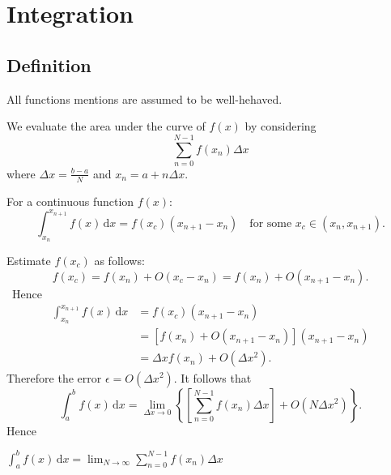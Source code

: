 \documentclass[10pt]{article}
\begin{document}
    \section{Integration}
    \subsection{Definition}
    All functions mentions are assumed to be well-hehaved.

    We evaluate the area under the curve of $f(x)$ by considering
    \[
        \sum_{n=0}^{N-1}f(x_n)\Delta x
    \]
    where $ \Delta x = \frac{b-a}{N} $ and $ x_n = a+n\Delta x. $
    \begin{theorem}[MVT]\label{thm:mean_value_theorem_for_integral}
        For a continuous function $f(x)$:
        \[
            \int_{x_n}^{x_{n+1}} f(x) \,\mathrm{d}x = f(x_c)(x_{n+1}-x_n) \quad \text{for some } x_c\in (x_n,x_{n+1})
        .\]
    \end{theorem}
    Estimate $ f(x_c) $ as follows:
    \[
        f(x_c) = f(x_n)+O(x_c-x_n) = f(x_n)+O(x_{n+1}-x_n)
    .\]\
    Hence
    \[
        \begin{aligned}
            \int_{x_n}^{x_{n+1}} f(x) \,\mathrm{d}x &= f(x_c)(x_{n+1}-x_n)\\
            &= [f(x_n)+O(x_{n+1}-x_n)](x_{n+1}-x_n)\\
            &= \Delta x f(x_n)+O(\Delta x^2).
        \end{aligned}
    \]
    Therefore the error $ \epsilon = O(\Delta x^2) $. It follows that
    \[
        \int_{a}^{b} f(x) \,\mathrm{d}x = \lim_{\Delta x \to 0} \left\{ \left[ \sum_{n=0}^{N-1}f(x_n)\Delta x \right] + O(N\Delta x^2)\right\}
    .\]
    Hence 
    \begin{definition}
        $\displaystyle \int_{a}^{b} f(x) \,\mathrm{d}x = \lim_{N \to \infty} \sum_{n=0}^{N-1}f(x_n)\Delta x$ 
    \end{definition}
\end{document}
